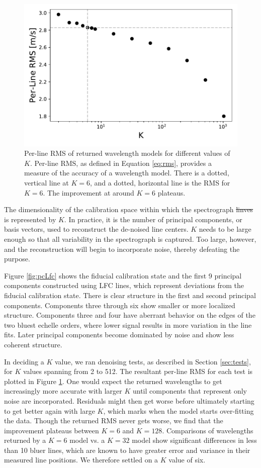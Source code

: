 \documentclass[twocolumn,table,xcolor,trackchanges]{aastex63} %
\providecommand{\DIFadd}[1]{{\protect\color{blue}\uwave{#1}}} %
\providecommand{\DIFdel}[1]{{\protect\color{red}\sout{#1}}}                      %
\providecommand{\DIFaddbegin}{} %
\providecommand{\DIFaddend}{} %
\providecommand{\DIFdelbegin}{} %
\providecommand{\DIFdelend}{} %
\begin{document}
\begin{figure}[b]
\centering
\includegraphics[width=.45\textwidth]{Figures/kvals_all.pdf}
\caption{Per-line RMS of returned wavelength models for different values of $K$.  Per-line RMS, as defined in Equation \ref{eq:rms}, provides a measure of the accuracy of a wavelength model.  There is a dotted, vertical line at $K=6$, and a dotted, horizontal line is the RMS for $K=6$.  The improvement at around $K=6$ plateaus.}
\label{fig:kvals}
\end{figure}
\label{sec:choice_k}
The dimensionality of the calibration space within which the spectrograph \DIFdelbegin \DIFdel{linves }\DIFdelend \DIFaddbegin \DIFadd{lives }\DIFaddend is represented by $K$.  In practice, it is the number of principal components, or basis vectors, used to reconstruct the de-noised line centers.  $K$ needs to be large enough so that all variability in the spectrograph is captured.  Too large, however, and the reconstruction will begin to incorporate noise, thereby defeating the purpose.

Figure \ref{fig:pcLfc} shows the fiducial calibration state and the first 9 principal components constructed using LFC lines, which represent deviations from the fiducial calibration state.  There is clear structure in the first and second principal components.  Components three through six show smaller or more localized structure.  Components three and four have aberrant behavior on the edges of the two bluest echelle orders, where lower signal results in more variation in the line fits.  Later principal components become dominated by noise and show less coherent structure.

In deciding a $K$ value, we ran denoising tests, as described in Section \ref{sec:tests}, for $K$ values spanning from 2 to 512.  The resultant per-line RMS for each test is plotted in Figure \ref{fig:kvals}.  One would expect the returned wavelengths to get increasingly more accurate with larger $K$ until components that represent only noise are incorporated.  Residuals might then get worse before ultimately starting to get better again with large $K$, which marks when the model starts over-fitting the data.  Though the returned RMS never gets worse, we find that the improvement plateaus between $K=6$ and $K=128$.  Comparisons of wavelengths returned by a $K=6$ model vs. a $K=32$ model show significant differences in less than 10 bluer lines, which are known to have greater error and variance in their measured line positions.  We therefore settled on a $K$ value of six.
\end{document}
